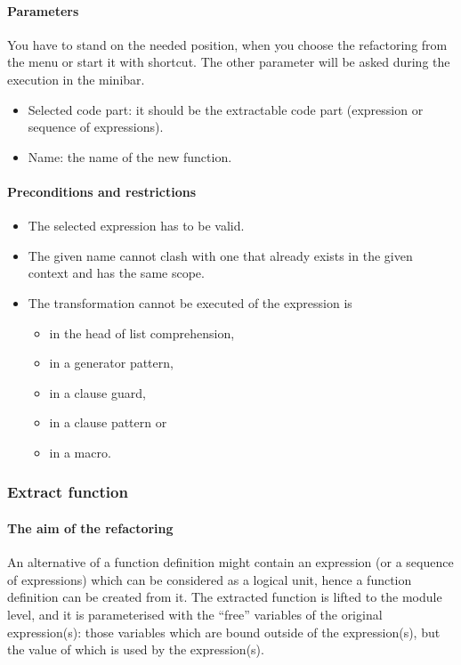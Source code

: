 \documentclass[12pt]{article}
\begin{document}
\paragraph{Parameters}
You have to stand on the needed position, when you choose the refactoring from the menu or start it with shortcut.
The other parameter will be asked during the execution in the minibar.
\begin{itemize}
	\item Selected code part: it should be the extractable code part (expression or sequence of expressions).
	\item Name: the name of the new function. 
\end{itemize}
\paragraph{Preconditions and restrictions}
\begin{itemize}
\item The selected expression has to be valid.
\item The given name cannot clash with one that already exists in the given
  context and has the same scope.
\item The transformation cannot be executed of the expression is
  \begin{itemize}
  	\item in the head of list comprehension,
  	\item in a generator pattern,
  	\item in a clause guard,
  	\item in a clause pattern or
  	\item in a macro.
  \end{itemize}
  
\end{itemize}
\subsubsection{Extract function}
\paragraph{The aim of the refactoring}
An alternative of a function definition might contain an expression
(or a sequence of expressions)
which can be considered as a logical unit, hence a function definition
can be created from it. The extracted function is lifted to the module
level, and it is parameterised with the ``free'' variables of the
original expression(s): those variables which are bound outside of the
expression(s), but the value of which is used by the expression(s).
\end{document}
